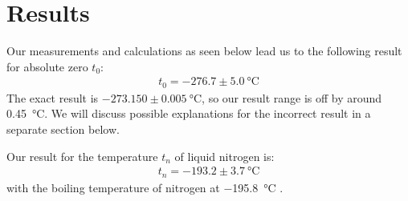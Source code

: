 \section{Results}

Our measurements and calculations as seen below lead us to the following result for absolute zero $t_0$:
\begin{align}
	t_0 = -276.7 \pm \SI{5.0}{\degreeCelsius} 
\end{align}
The exact result is $-273.150 \pm \SI{0.005}{\degreeCelsius}$, so our result range is off by around \SI{0.45}{\degreeCelsius}. We will discuss possible explanations for the incorrect result in a separate section below. 


Our result for the temperature $t_n$ of liquid nitrogen is:
\begin{align}
	t_n = -193.2 \pm \SI{3.7}{\degreeCelsius} 
\end{align}
with the boiling temperature of nitrogen \cite{nitro} at \SI{-195.8}{\degreeCelsius}  .
